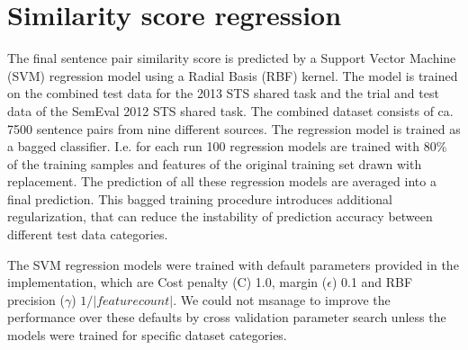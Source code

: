 
\section{Similarity score regression}
\label{sec:regression}

The final sentence pair similarity score is predicted by a Support Vector Machine (SVM) regression model using a Radial Basis (RBF) kernel. The model is trained on the combined test data for the 2013 STS shared task and the trial and test data of the SemEval 2012 STS shared task. The combined dataset consists of ca. 7500 sentence pairs from nine different sources. The regression model is trained as a bagged classifier. I.e. for each run 100 regression models are trained with 80\% of the training samples and features of the original training set drawn with replacement. The prediction of all these regression models are averaged into a final prediction. This bagged training procedure introduces additional regularization, that can  reduce the instability of prediction accuracy between different test data categories.

The SVM regression models were trained with default parameters provided in the implementation, which are Cost penalty (C) 1.0, margin ($\epsilon$) 0.1 and RBF precision ($\gamma$) $1/|feature count|$. We could not msanage to improve the performance over these defaults by cross validation parameter search unless the models were trained for specific dataset categories.
